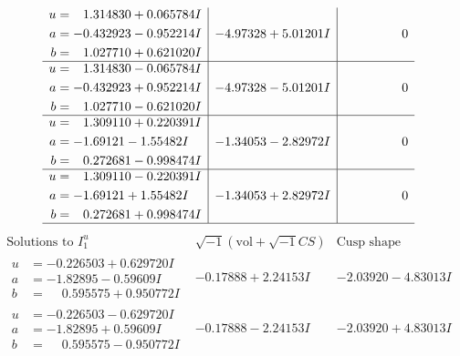 \documentclass[1p]{elsarticle_modified}
\theoremstyle{definition}
\newcommand{\I}{\sqrt{-1}}
\begin{document}
$$\begin{array}{c|c|c}
\begin{aligned}
u &= \phantom{-}1.314830 + 0.065784 I \\
a &= -0.432923 - 0.952214 I \\
b &= \phantom{-}1.027710 + 0.621020 I\end{aligned}
 & -4.97328 + 5.01201 I & \phantom{-0.000000 } 0 \\ \hline\begin{aligned}
u &= \phantom{-}1.314830 - 0.065784 I \\
a &= -0.432923 + 0.952214 I \\
b &= \phantom{-}1.027710 - 0.621020 I\end{aligned}
 & -4.97328 - 5.01201 I & \phantom{-0.000000 } 0 \\ \hline\begin{aligned}
u &= \phantom{-}1.309110 + 0.220391 I \\
a &= -1.69121 - 1.55482 I \\
b &= \phantom{-}0.272681 - 0.998474 I\end{aligned}
 & -1.34053 - 2.82972 I & \phantom{-0.000000 } 0 \\ \hline\begin{aligned}
u &= \phantom{-}1.309110 - 0.220391 I \\
a &= -1.69121 + 1.55482 I \\
b &= \phantom{-}0.272681 + 0.998474 I\end{aligned}
 & -1.34053 + 2.82972 I & \phantom{-0.000000 } 0\\
 \hline 
 \end{array}$$\newpage$$\begin{array}{c|c|c}  
\text{Solutions to }I^u_{1}& \I (\text{vol} + \sqrt{-1}CS) & \text{Cusp shape}\\
 \hline 
\begin{aligned}
u &= -0.226503 + 0.629720 I \\
a &= -1.82895 - 0.59609 I \\
b &= \phantom{-}0.595575 + 0.950772 I\end{aligned}
 & -0.17888 + 2.24153 I & -2.03920 - 4.83013 I \\ \hline\begin{aligned}
u &= -0.226503 - 0.629720 I \\
a &= -1.82895 + 0.59609 I \\
b &= \phantom{-}0.595575 - 0.950772 I\end{aligned}
 & -0.17888 - 2.24153 I & -2.03920 + 4.83013 I \\ \hline\begin{aligned}

\end{aligned}
\end{array}$$
\end{document}
